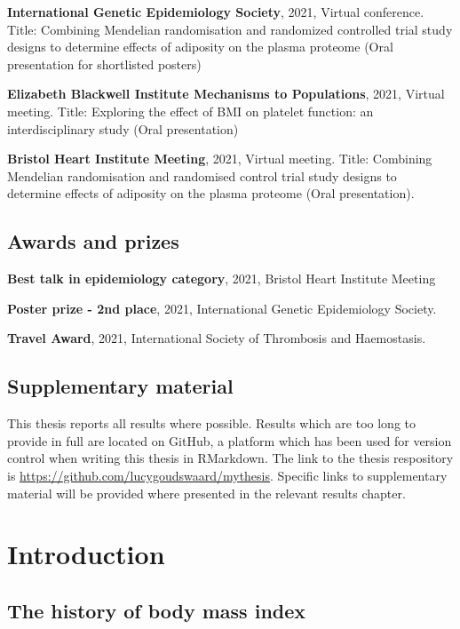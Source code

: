 \documentclass[11pt,twoside]{bristolthesis}
\begin{document}
\textbf{International Genetic Epidemiology Society}, 2021, Virtual conference. Title: Combining Mendelian randomisation and randomized controlled trial study designs to determine effects of adiposity on the plasma proteome (Oral presentation for shortlisted posters)

\textbf{Elizabeth Blackwell Institute Mechanisms to Populations}, 2021, Virtual meeting. Title: Exploring the effect of BMI on platelet function: an interdisciplinary study (Oral presentation)

\textbf{Bristol Heart Institute Meeting}, 2021, Virtual meeting. Title: Combining Mendelian randomisation and randomised control trial study designs to determine effects of adiposity on the plasma proteome (Oral presentation).

\hypertarget{awards-and-prizes}{%
\section{Awards and prizes}\label{awards-and-prizes}}

\textbf{Best talk in epidemiology category}, 2021, Bristol Heart Institute Meeting

\textbf{Poster prize - 2nd place}, 2021, International Genetic Epidemiology Society.

\textbf{Travel Award}, 2021, International Society of Thrombosis and Haemostasis.

\hypertarget{supplementary-material}{%
\section{Supplementary material}\label{supplementary-material}}

This thesis reports all results where possible. Results which are too long to provide in full are located on GitHub, a platform which has been used for version control when writing this thesis in RMarkdown. The link to the thesis respository is \url{https://github.com/lucygoudswaard/mythesis}. Specific links to supplementary material will be provided where presented in the relevant results chapter.

\hypertarget{background}{%
\chapter{Introduction}\label{background}}

\hypertarget{the-history-of-body-mass-index}{%
\section{The history of body mass index}\label{the-history-of-body-mass-index}}
\end{document}
